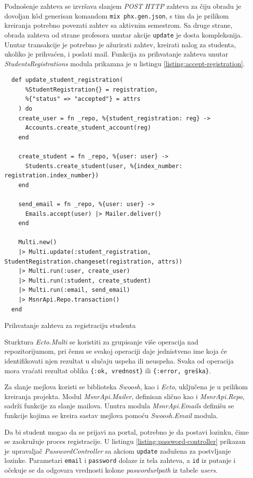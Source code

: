 \documentclass[12pt,oneside]{memoir}
\begin{document}
Podnošenje zahteva se izvršava slanjem \emph{POST} \emph{HTTP} zahteva za čiju obradu je dovoljan k\^{o}d generisan komandom
\texttt{mix phx.gen.json}, s tim da je prilikom kreiranja potrebno povezati zahtev sa aktivnim semestrom.
Sa druge strane, obrada zahteva od strane profesora unutar akcije \texttt{update} je dosta kompleksnija.
Unutar transakcije je potrebno je ažurirati zahtev, kreirati nalog za studenta, ukoliko je prihvaćen, i poslati mail.
Funkcija za prihvatanje zahteva unutar \emph{StudentsRegistrations} modula prikazana je u listingu \ref{listing:accept-registration}.
\begin{listing}[h]
\begin{verbatim}
  def update_student_registration(
      %StudentRegistration{} = registration,
      %{"status" => "accepted"} = attrs
    ) do
    create_user = fn _repo, %{student_registration: reg} ->
      Accounts.create_student_account(reg)
    end

    create_student = fn _repo, %{user: user} ->
      Students.create_student(user, %{index_number: registration.index_number})
    end

    send_email = fn _repo, %{user: user} ->
      Emails.accept(user) |> Mailer.deliver()
    end

    Multi.new()
    |> Multi.update(:student_registration, StudentRegistration.changeset(registration, attrs))
    |> Multi.run(:user, create_user)
    |> Multi.run(:student, create_student)
    |> Multi.run(:email, send_email)
    |> MsnrApi.Repo.transaction()
  end
\end{verbatim}
\caption{Prihvatanje zahteva za registraciju studenta}
\label{listing:accept-registration}
\end{listing}
Sturktura \emph{Ecto.Multi} se koristiti za grupisanje više operacija nad repozitorijumom, pri čemu se svakoj
operaciji daje jednistveno ime koja će identifikovati njen rezultat u slučaju uspeha ili neuspeha. Svaka od 
operacija mora vraćati rezultat oblika \texttt{\{:ok, vrednost\}} ili \texttt{\{:error, greška\}}.

Za slanje mejlova koristi se biblioteka \emph{Swoosh}, kao i \emph{Ecto}, uključena je u prilikom kreiranja
projekta. Modul \emph{MsnrApi.Mailer}, definisan slično kao i \emph{MsnrApi.Repo}, sadrži funkcije za slanje mailova.
Unutra modula \emph{MsnrApi.Emails} definišu se funkcije kojima se kreira sastav mejlova pomoću \emph{Swoosh.Email} modula.

Da bi student mogao da se prijavi na portal, potrebno je da postavi lozinku, čime se zaokružuje proces registracije.
U listingu \ref{listing:password-controller} prikazan je upravaljač \emph{PasswordController} sa akciom \texttt{update}
zadužena za postvljanje lozinke. Parametari \texttt{email} i \texttt{password} dolaze iz tela zahteva, a \texttt{id} iz putanje
i očekuje se da odgovara vrednosti kolone \emph{pasword{\textunderscore}url{\textunderscore}path} iz tabele \emph{users}.
\end{document}
